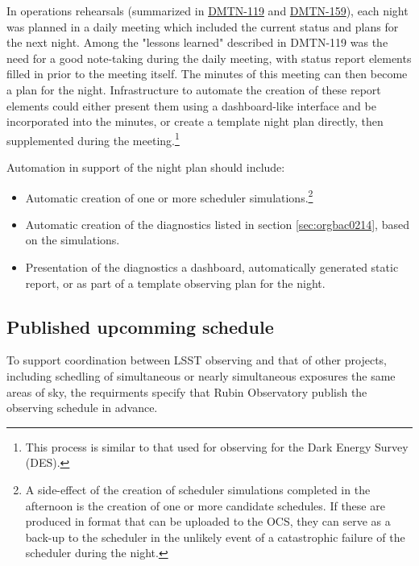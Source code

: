 In operations rehearsals (summarized in \href{https://dmtn-119.lsst.io}{DMTN-119} and \href{https://dmtn-159.lsst.io/}{DMTN-159}), each night was planned in a daily meeting which included the current status and plans for the next night.
Among the "lessons learned" described in DMTN-119 was the need for a good note-taking during the daily meeting, with status report elements filled in prior to the meeting itself. 
The minutes of this meeting can then become a plan for the night.
Infrastructure to automate the creation of these report elements could either present them using a dashboard-like interface and be incorporated into the minutes, or create a template night plan directly, then supplemented during the meeting.\footnote{This process is similar to that used for observing for the Dark Energy Survey (DES).}

Automation in support of the night plan should include:
\begin{itemize}
\item Automatic creation of one or more scheduler simulations.\footnote{A side-effect of the creation of scheduler simulations completed in the afternoon is the creation of one or more candidate schedules. If these are produced in format that can be uploaded to the OCS, they can serve as a back-up to the scheduler in the unlikely event of a catastrophic failure of the scheduler during the night.}
\item Automatic creation of the diagnostics listed in section \ref{sec:orgbac0214}, based on the simulations.
\item Presentation of the diagnostics a dashboard, automatically generated static report, or as part of a template observing plan for the night.
\end{itemize}

\subsection{Published upcomming schedule}
\label{sec:orgb2964f0}
To support coordination between LSST observing and that of other projects, including schedling of simultaneous or nearly simultaneous exposures the same areas of sky, the requirments specify that Rubin Observatory publish the observing schedule in advance.

